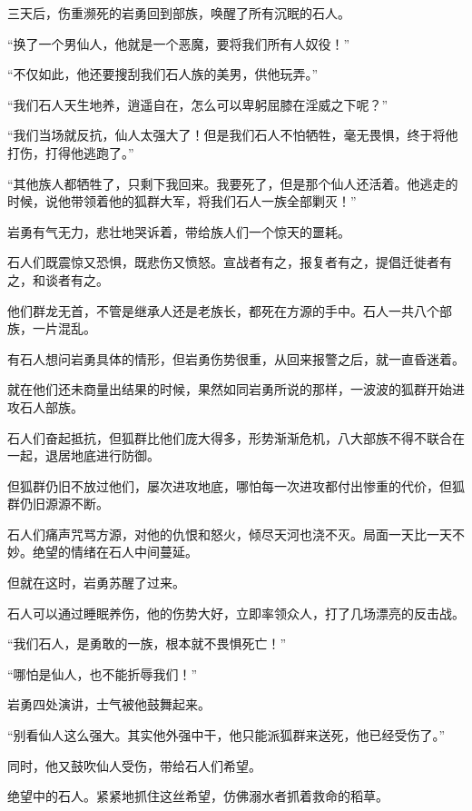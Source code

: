 
\begin{this_body}

三天后，伤重濒死的岩勇回到部族，唤醒了所有沉眠的石人。

“换了一个男仙人，他就是一个恶魔，要将我们所有人奴役！”

“不仅如此，他还要搜刮我们石人族的美男，供他玩弄。”

“我们石人天生地养，逍遥自在，怎么可以卑躬屈膝在淫威之下呢？”

“我们当场就反抗，仙人太强大了！但是我们石人不怕牺牲，毫无畏惧，终于将他打伤，打得他逃跑了。”

“其他族人都牺牲了，只剩下我回来。我要死了，但是那个仙人还活着。他逃走的时候，说他带领着他的狐群大军，将我们石人一族全部剿灭！”

岩勇有气无力，悲壮地哭诉着，带给族人们一个惊天的噩耗。

石人们既震惊又恐惧，既悲伤又愤怒。宣战者有之，报复者有之，提倡迁徙者有之，和谈者有之。

他们群龙无首，不管是继承人还是老族长，都死在方源的手中。石人一共八个部族，一片混乱。

有石人想问岩勇具体的情形，但岩勇伤势很重，从回来报警之后，就一直昏迷着。

就在他们还未商量出结果的时候，果然如同岩勇所说的那样，一波波的狐群开始进攻石人部族。

石人们奋起抵抗，但狐群比他们庞大得多，形势渐渐危机，八大部族不得不联合在一起，退居地底进行防御。

但狐群仍旧不放过他们，屡次进攻地底，哪怕每一次进攻都付出惨重的代价，但狐群仍旧源源不断。

石人们痛声咒骂方源，对他的仇恨和怒火，倾尽天河也浇不灭。局面一天比一天不妙。绝望的情绪在石人中间蔓延。

但就在这时，岩勇苏醒了过来。

石人可以通过睡眠养伤，他的伤势大好，立即率领众人，打了几场漂亮的反击战。

“我们石人，是勇敢的一族，根本就不畏惧死亡！”

“哪怕是仙人，也不能折辱我们！”

岩勇四处演讲，士气被他鼓舞起来。

“别看仙人这么强大。其实他外强中干，他只能派狐群来送死，他已经受伤了。”

同时，他又鼓吹仙人受伤，带给石人们希望。

绝望中的石人。紧紧地抓住这丝希望，仿佛溺水者抓着救命的稻草。


\end{this_body}

